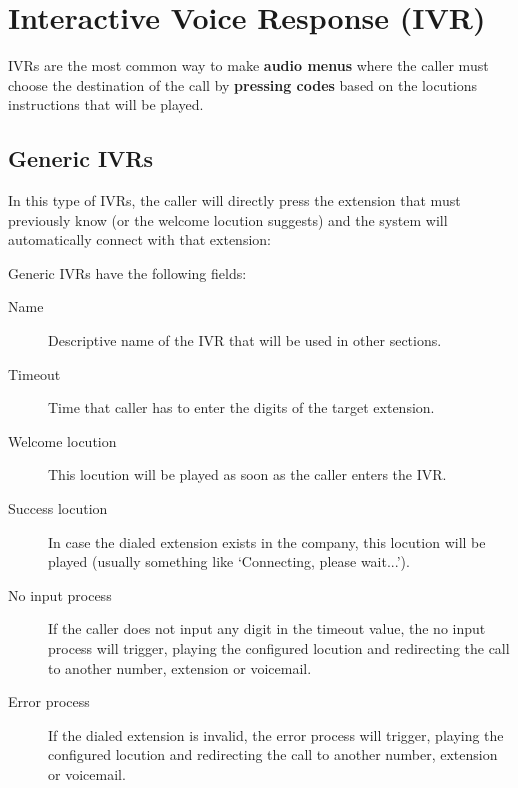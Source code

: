 \documentclass[letterpaper,10pt,english]{sphinxmanual}
\begin{document}
\section{Interactive Voice Response (IVR)}
\label{pbx_features/ivrs::doc}\label{pbx_features/ivrs:interactive-voice-response-ivr}
IVRs are the most common way to make \textbf{audio menus} where the caller must
choose the destination of the call by \textbf{pressing codes} based on the locutions
instructions that will be played.


\subsection{Generic IVRs}
\label{pbx_features/ivrs:generic-ivrs}\label{pbx_features/ivrs:id1}
In this type of IVRs, the caller will directly press the extension that must
previously know (or the welcome locution suggests) and the system will
automatically connect with that extension:

Generic IVRs have the following fields:
\begin{description}
\item[{Name}] \leavevmode{}\label{pbx_features/ivrs:term-name}
Descriptive name of the IVR that will be used in other sections.

\item[{Timeout}] \leavevmode{}\label{pbx_features/ivrs:term-timeout}
Time that caller has to enter the digits of the target extension.

\item[{Welcome locution}] \leavevmode{}\label{pbx_features/ivrs:term-welcome-locution}
This locution will be played as soon as the caller enters the IVR.

\item[{Success locution}] \leavevmode{}\label{pbx_features/ivrs:term-success-locution}
In case the dialed extension exists in the company, this locution will
be played (usually something like `Connecting, please wait...').

\item[{No input process}] \leavevmode{}\label{pbx_features/ivrs:term-no-input-process}
If the caller does not input any digit in the timeout value, the
no input process will trigger, playing the configured locution and
redirecting the call to another number, extension or voicemail.

\item[{Error process}] \leavevmode{}\label{pbx_features/ivrs:term-error-process}
If the dialed extension is invalid, the error process will trigger,
playing the configured locution and redirecting the call to another
number, extension or voicemail.

\end{description}
\end{document}
